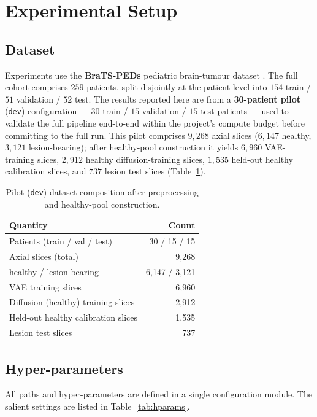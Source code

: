 \documentclass[12pt, a4paper]{article}
\begin{document}
\section{Experimental Setup}
\subsection{Dataset}
Experiments use the \textbf{BraTS-PEDs} pediatric brain-tumour dataset \cite{kazerooni2024}. The full cohort comprises $259$ patients, split disjointly at the patient level into $154$ train / $51$ validation / $52$ test. The results reported here are from a \textbf{30-patient pilot} (\texttt{dev}) configuration — $30$ train / $15$ validation / $15$ test patients — used to validate the full pipeline end-to-end within the project's compute budget before committing to the full run. This pilot comprises $9{,}268$ axial slices ($6{,}147$ healthy, $3{,}121$ lesion-bearing); after healthy-pool construction it yields $6{,}960$ VAE-training slices, $2{,}912$ healthy diffusion-training slices, $1{,}535$ held-out healthy calibration slices, and $737$ lesion test slices (Table~\ref{tab:dataset}).

\begin{table}[h!]
    \centering
    \caption{Pilot (\texttt{dev}) dataset composition after preprocessing and healthy-pool construction.}
    \label{tab:dataset}
    \begin{tabular}{@{}lr@{}}
        \toprule
        \textbf{Quantity} & \textbf{Count} \\
        \midrule
        Patients (train / val / test)            & 30 / 15 / 15 \\
        Axial slices (total)                     & 9{,}268 \\
        \quad healthy / lesion-bearing           & 6{,}147 / 3{,}121 \\
        VAE training slices                      & 6{,}960 \\
        Diffusion (healthy) training slices      & 2{,}912 \\
        Held-out healthy calibration slices      & 1{,}535 \\
        Lesion test slices                       & 737 \\
        \bottomrule
    \end{tabular}
\end{table}

\subsection{Hyper-parameters}
All paths and hyper-parameters are defined in a single configuration module. The salient settings are listed in Table~\ref{tab:hparams}.
\end{document}
